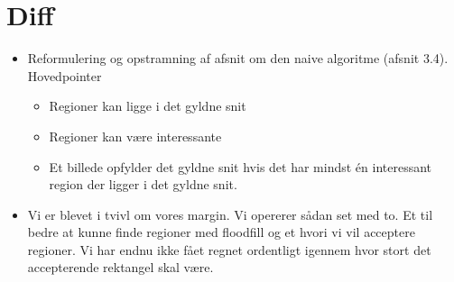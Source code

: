 {
\section*{Diff}
\begin{itemize}
	\item Reformulering og opstramning af afsnit om den naive
		algoritme (afsnit 3.4).\\
		Hovedpointer
		\begin{itemize}
			\item Regioner kan ligge i det gyldne snit
			\item Regioner kan være interessante
			\item Et billede opfylder det gyldne snit hvis
				det har mindst én interessant region der
				ligger i det gyldne snit.
		\end{itemize}
	\item Vi er blevet i tvivl om vores margin. Vi opererer sådan
		set med to. Et til bedre at kunne finde regioner med
		floodfill og et hvori vi vil acceptere regioner. Vi har
		endnu ikke fået regnet ordentligt igennem hvor stort det
		accepterende rektangel skal være.
\end{itemize}

}


